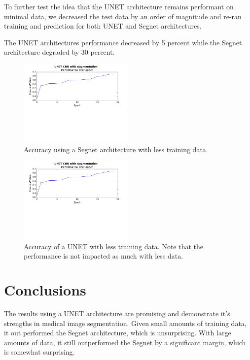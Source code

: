 \documentclass[letterpaper]{article}
\begin{document}
To further test the idea that the UNET architecture remains performant on minimal data, we decreased the test data by an order of magnitude and re-ran training and prediction for both UNET and Segnet architectures. 

The UNET architectures performance decreased by 5 percent while the Segnet architecture degraded by 30 percent.

 \begin{figure}[H]
  \centerline{\includegraphics[width=0.5\textwidth]{Plots/SegNet.png}}
  \caption{Accuracy using a Segnet architecture with less training data}
  \label{fig:trainingovertime2.}
\end{figure}

 \begin{figure}[H]
  \centerline{\includegraphics[width=0.5\textwidth]{Plots/SegNet.png}}
  \caption{Accuracy of a UNET with less training data. Note that the performance is not impacted as much with less data.}
  \label{fig:trainingovertime2.}
\end{figure}



\section{Conclusions}
The results using a UNET architecture are promising and demonstrate it's strengths in medical image segmentation. Given small amounts of training data, it out performed the Segnet architecture, which is unsurprising. With large amounts of data, it still outperformed the Segnet by a significant margin, which is somewhat surprising. 
\end{document}
